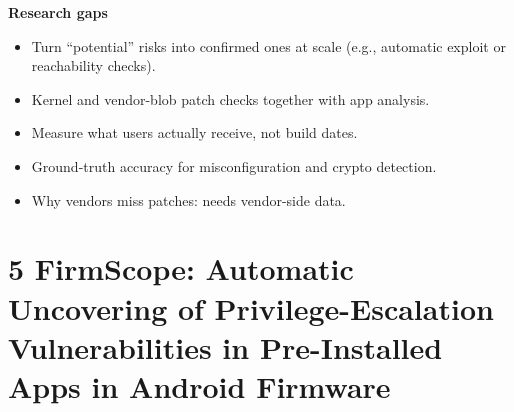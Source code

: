 \documentclass[11pt,a4paper]{article}
\begin{document}
\begin{enumerate}
    \vspace{4pt}
    \textbf{Research gaps}
    \begin{itemize}
        \item Turn ``potential'' risks into confirmed ones at scale (e.g., automatic exploit or reachability checks).
        \item Kernel and vendor-blob patch checks together with app analysis.
        \item Measure what users actually receive, not build dates.
        \item Ground-truth accuracy for misconfiguration and crypto detection.
        \item Why vendors miss patches: needs vendor-side data.
    \end{itemize}

\end{enumerate}

\newpage

\section{5 FirmScope: Automatic Uncovering of Privilege-Escalation Vulnerabilities in Pre-Installed Apps in Android Firmware}
\end{document}
